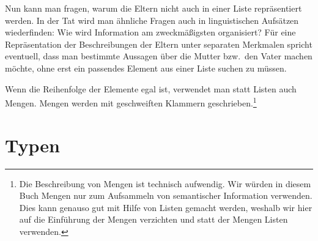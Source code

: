 \ea
{}
\z
Nun kann man fragen, warum die Eltern nicht auch in einer Liste repräsentiert werden.
In der Tat wird man ähnliche Fragen auch in linguistischen Aufsätzen wiederfinden:
Wie wird Information am zweckmäßigsten organisiert? Für eine Repräsentation der Beschreibungen
der Eltern unter separaten Merkmalen spricht eventuell, dass man bestimmte Aussagen über die
Mutter bzw.\ den Vater machen möchte, ohne erst ein passendes Element aus einer Liste suchen
zu müssen.

Wenn die Reihenfolge der Elemente egal ist, verwendet man statt Listen auch Mengen.
Mengen werden mit geschweiften Klammern geschrieben.\footnote{
 Die Beschreibung von Mengen ist technisch aufwendig.
 Wir würden in diesem Buch Mengen nur zum Aufsammeln von semantischer Information verwenden.
 Dies kann genauso gut mit Hilfe von Listen gemacht werden, weshalb wir hier auf die
 Einführung der Mengen verzichten und statt der Mengen Listen verwenden.%
}

\section{Typen}
\label{sec-formalismus-typen}

